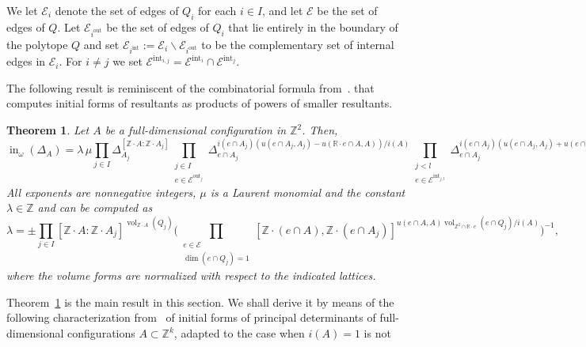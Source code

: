 \documentclass[11pt]{amsart}
\numberwithin{equation}{section}
\theoremstyle{plain}
\newtheorem{theorem}{Theorem}[section]
\theoremstyle{definition}
\theoremstyle{remark}
\begin{document}
We let $\mathcal{E}_i$ denote the set of edges of $Q_i$ for each $i\in
I$, and let $\mathcal{E}$ be the set of edges of $Q$. Let
$\mathcal{E}_i^\operatorname{out}$ be the set of edges of $Q_i$ that lie
entirely in the boundary of the polytope $Q$ and set
$\mathcal{E}_i^\operatorname{int}:=\mathcal{E}_i\smallsetminus
\mathcal{E}_i^\operatorname{out}$ to be the complementary set of internal
edges in $\mathcal{E}_i$.  For $i\neq j$ we set
$\mathcal{E}^\operatorname{int}_{i,j}=\mathcal{E}^\operatorname{int}_{i} \cap
\mathcal{E}^\operatorname{int}_{j}$.

The following result is reminiscent of the combinatorial formula
from~\cite[Theorem 4.1]{Stu94}. that computes initial forms of
resultants as products of powers of smaller resultants.
\begin{theorem}\label{thm:factorizationFormula} Let $A$ be a full-dimensional configuration in ${\mathbb{Z}}^2$. Then,
  \begin{equation*}
    \operatorname{in}_{\omega}(\Delta_A)
    \!=\!\lambda \,\mu\prod_{j\in I} \Delta_{A_j}^{[{\mathbb{Z}}\cdot\! A:{\mathbb{Z}}\cdot\! A_j]}\!\!\! 
    \prod_{\substack{j\in I\\e\in
        \mathcal{E}^\operatorname{out}_j}}\!\!\!\Delta_{e\cap A_j}^{i(e\cap
      A_j)
      (u(e\cap A_j,A_j)-u({\mathbb{R}}\cdot e\cap A, A))/i(A)}
    \!\!\!\prod_{\substack{j<l\\e\in
        \mathcal{E}^\operatorname{int}_{j,l}\!}}\!\!\!\Delta_{e\cap A_j}^{i(e\cap
      A_j)
      (u(e\cap A_j, A_j)+u(e\cap A_l, A_l))/i(A)}.
\label{eq:factorization}
\end{equation*}
All exponents are nonnegative integers, $\mu$ is a Laurent monomial
and the constant $\lambda \in {\mathbb{Z}}$ and can be computed as 
\[
\lambda=\pm \prod_{j\in I}[{\mathbb{Z}}{\!\cdot\!} A:{\mathbb{Z}}{\!\cdot\!}
A_j]^{\operatorname{\operatorname{vol}}_{{\mathbb{Z}}\cdot\! A}(Q_j)}\big(\prod_{\substack{e\in\mathcal{E}\\ \dim(e\cap Q_j)=1}} [{\mathbb{Z}}{\!\cdot\!}(e\cap A),
{\mathbb{Z}}{\!\cdot\!}(e\cap A_j)]^{u(e\cap A, A)\operatorname{\operatorname{vol}}_{{\mathbb{Z}}^2\cap {\mathbb{R}} 
    \cdot e}(e\cap Q_j)/i(A)}\big)^{-1},
\]
where the volume forms are normalized with respect to the indicated lattices.
\end{theorem}
Theorem~\ref{thm:factorizationFormula} is the main result in this
section. We shall derive it by means of the following characterization from~\cite[Chapter 10.1.E,
Theorem $12'$]{GKZ}
of initial forms of principal determinants of full-dimensional configurations $A\subset {\mathbb{Z}}^k$, adapted to the case when $i(A)=1$ is not
\end{document}
